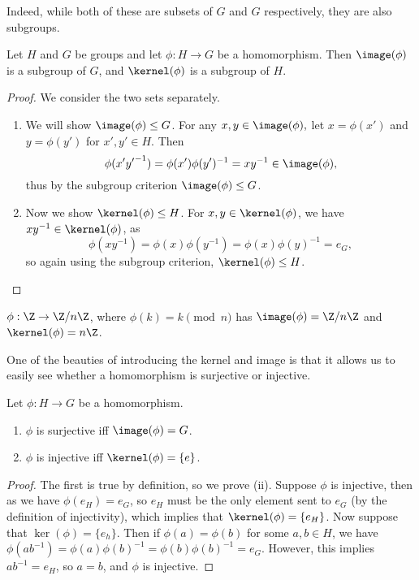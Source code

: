 \documentclass[a4]{scrreprt}
\begin{document}
Indeed, while both of these are subsets of $G$ and $G$ respectively, they are also subgroups.

\begin{proposition}
	Let $H$ and $G$ be groups and let $\phi : H \rightarrow G$ be a homomorphism. Then $\image(\phi)$ is a subgroup of $G$, and $\kernel(\phi)$ is a subgroup of $H$.
\end{proposition}
\begin{proof}
	We consider the two sets separately.
	\begin{enumerate}
		\item We will show $\image(\phi) \leq G$. For any $x, y \in \image(\phi),$ let $x = \phi(x')$ and $y = \phi(y')$ for $x', y' \in H$. Then
		$$
		\phi(x' {y'}^{-1}) = \phi(x')\phi(y')^{-1} = x y^{-1} \in \image(\phi),
		$$
		thus by the subgroup criterion $\image(\phi) \leq G$.
		\item Now we show $\kernel(\phi) \leq H$. For $x, y \in \kernel(\phi)$, we have $xy^{-1} \in \kernel(\phi)$, as 
		$$
		\phi(xy^{-1}) = \phi(x)\phi(y^{-1}) = \phi(x)\phi(y)^{-1} = e_G,
		$$
		so again using the subgroup criterion, $\kernel(\phi) \leq H$. 
	\end{enumerate}
\end{proof}

\begin{example}
	$\phi : \Z \rightarrow \Z/n\Z$, where $\phi(k) = k \pmod{n}$ has $\image(\phi) = \Z/n\Z$ and $\kernel(\phi) = n\Z$.
\end{example}

One of the beauties of introducing the kernel and image is that it allows us to easily see whether a homomorphism is surjective or injective.

\begin{proposition}
	Let $\phi : H \rightarrow G$ be a homomorphism.
	\begin{enumerate}[label=(\roman*)]
		\item $\phi$ is surjective iff $\image(\phi) = G$.
		\item $\phi$ is injective iff $\kernel(\phi) = \{e\}$.
	\end{enumerate}	
\end{proposition}
\begin{proof}
	The first is true by definition, so we prove (ii). Suppose $\phi$ is injective, then as we have $\phi(e_H) = e_G$, so $e_H$ must be the only element sent to $e_G$ (by the definition of injectivity), which implies that $\kernel(\phi) = \{ e_H \}$.
	Now suppose that $\ker(\phi) = \{ e_h \}$. Then if $\phi(a) = \phi(b)$ for some $a, b \in H$, we  have $\phi(ab^{-1}) = \phi(a)\phi(b)^{-1} = \phi(b)\phi(b)^{-1} = e_G$. However, this implies $ab^{-1} = e_H$, so $a = b$, and $\phi$ is injective.
\end{proof}
\end{document}
